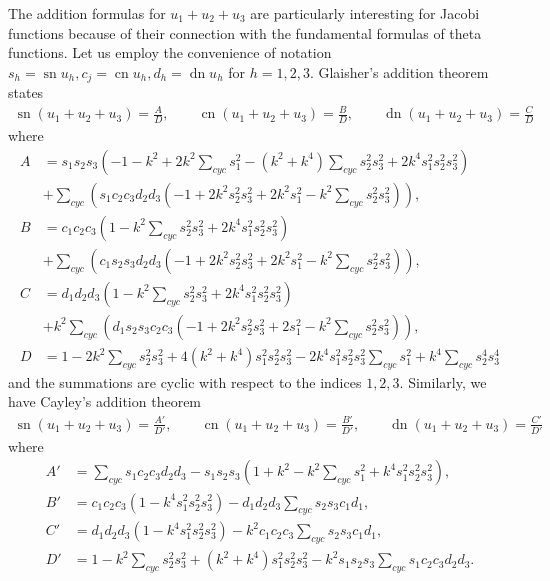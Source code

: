 \documentclass{amsart}
\theoremstyle{definition}
\DeclareMathOperator{\dn}{dn}
\DeclareMathOperator{\sn}{sn}
\DeclareMathOperator{\cn}{cn}
\begin{document}
The addition formulas for $u_1+u_2+u_3$ are particularly interesting for Jacobi functions because of their connection with the fundamental formulas of theta functions. Let us employ the convenience of notation $s_h=\sn u_h, c_j=\cn u_h, d_h=\dn u_h$ for $h=1,2,3$. Glaisher's addition theorem \cite{Glaisher} states
\begin{align*}
    \sn(u_1+u_2+u_3)=\frac{A}{D}, \qquad \cn(u_1+u_2+u_3)=\frac{B}{D},\qquad \dn(u_1+u_2+u_3)=\frac{C}{D}
\end{align*}
where
\begin{align*}
    A&=s_1s_2s_3\left( -1-k^2+2k^2\sum_{cyc} s_1^2 -\left( k^2+k^4 \right)\sum_{cyc} s_2^2s_3^2+2k^4s_1^2s_2^2s_3^2\right)\\
&+\sum_{cyc}^{}\left(s_1c_2c_3d_2d_3\left( -1+2k^2s_2^2s_3^2+2k^2s_1^2-k^2\sum_{cyc}^{}s_2^2s_3^2 \right)  \right),\\
B&=c_1c_2c_3\left( 1-k^2\sum_{cyc}^{}s_2^2s_3^2 +2k^4s_1^2s_2^2s_3^2\right)\\
&+\sum_{cyc}^{}\left(c_1s_2s_3d_2d_3\left( -1+2k^2s_2^2s_3^2+2k^2s_1^2-k^2\sum_{cyc}^{}s_2^2s_3^2 \right)  \right),\\
C&=d_1d_2d_3\left( 1-k^2\sum_{cyc}^{}s_2^2s_3^2 +2k^4s_1^2s_2^2s_3^2\right)\\
&+k^2\sum_{cyc}^{}\left(d_1s_2s_3c_2c_3\left( -1+2k^2s_2^2s_3^2+2s_1^2-k^2\sum_{cyc}^{}s_2^2s_3^2 \right)  \right),\\
D&=1-2k^2\sum_{cyc}s_2^2s_3^2+4\left( k^2+k^4 \right)s_1^2s_2^2s_3^2-2k^4s_1^2s_2^2s_3^2\sum_{cyc}s_1^2+k^4\sum_{cyc}^{}s_2^4s_3^4
\end{align*}
and the summations are cyclic with respect to the indices $1,2,3$. Similarly, we have Cayley's addition theorem \cite{Cayley3}
\begin{align*}
        \sn(u_1+u_2+u_3)=\frac{A'}{D'}, \qquad \cn(u_1+u_2+u_3)=\frac{B'}{D'},\qquad \dn(u_1+u_2+u_3)=\frac{C'}{D'}
\end{align*}
where
\begin{align*}
    A'&=\sum_{cyc}^{}s_1c_2c_3d_2d_3-s_1s_2s_3\left( 1+k^2-k^2\sum_{cyc}^{}s_1^2+k^4s_1^2s_2^2s_3^2 \right),\\
B'&=c_1c_2c_3\left(1- k^4s_1^2s_2^2s_3^2\right)-d_1d_2d_3\sum_{cyc}^{}s_2s_3c_1d_1,\\
C'&=d_1d_2d_3\left(1- k^4s_1^2s_2^2s_3^2\right)-k^2c_1c_2c_3\sum_{cyc}^{}s_2s_3c_1d_1,\\
D'&=1-k^2\sum_{cyc}^{}s_2^2s_3^2+\left( k^2+k^4 \right)s_1^2s_2^2s_3^2-k^2s_1s_2s_3\sum_{cyc}^{}s_1c_2c_3d_2d_3.
\end{align*}
\end{document}
